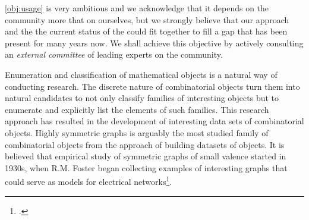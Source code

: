  \cref{obj:usage} is very ambitious and we acknowledge that it depends on the community more that on ourselves, but we strongly believe that our approach and the the current status of the could fit together to fill a gap that has been present for many years now.
 We shall achieve this objective by actively consulting an \emph{external committee} of leading experts on the community.





Enumeration and classification of mathematical objects is a natural way of conducting research.
The discrete nature of combinatorial objects turn them into natural candidates to not only classify families of interesting objects but to enumerate and explicitly list the elements of such families.
This research approach has resulted in the development of interesting data sets of combinatorial objects.
Highly symmetric graphs is arguably the most studied family of combinatorial objects from the approach of building datasets of objects.
It is believed that empirical study of symmetric graphs of small valence started in 1930s, when R.M. Foster began collecting examples of interesting graphs that could serve as models for electrical networks\footcite{Foster_1932_GeometricalCircuitsElectrical}.


